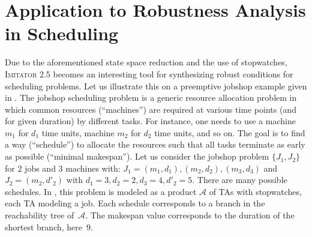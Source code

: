 \documentclass{llncs}
\newcommand{\A}{\mathcal{A}}
\newcommand{\imitator}{\textsc{Imitator}}
\begin{document}
\section{Application to Robustness Analysis in  Scheduling}

Due to the aforementioned state space reduction and the use of stopwatches, \imitator{} 2.5 becomes an interesting tool for synthesizing robust conditions for scheduling problems.
Let us illustrate this on a preemptive jobshop example given in \cite{AM02}.
The jobshop scheduling problem is a generic resource allocation problem in which common resources (``machines'') are required at various time points (and for given duration) by different tasks.
For instance, one needs to use a machine $m_1$ for $d_1$ time units, machine $m_2$ for $d_2$ time units, and so on.
The goal is to find a way (``schedule'') to allocate the resources such that all tasks terminate as early as possible (``minimal makespan'').
%
Let us consider the jobshop problem $\{J_1, J_2\}$ for 2 jobs and 3 machines  with: $J_1 = (m_1,d_1), (m_2,d_2),(m_3,d_3)$ and $J_2 = (m_2,d'_2)$ with $d_1 = 3, d_2=2, d_3=4, d'_2 = 5$.
There are many possible schedules. %
%
In  \cite{AM02}, this problem is modeled as a product $\A$ of TAs with stopwatches, each TA modeling a job.
Each schedule corresponds to a branch in the reachability tree of~$\A$.
The makespan value corresponds to the
duration of the shortest branch, here~9.
% 
\end{document}
